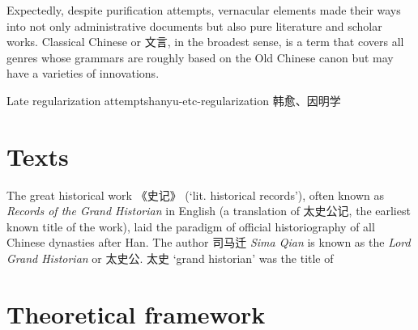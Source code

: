 \documentclass[UTF8, a4paper, oneside, scheme=plain, 12pt]{ctexrep}
\newcommand{\form}[1]{\emph{#1}}
\newcommand{\translate}[1]{`#1'}
\begin{document}
Expectedly, despite purification attempts,
vernacular elements made their ways into not only administrative documents
but also pure literature and scholar works.
Classical Chinese or 文言, in the broadest sense,
is a term that covers all genres whose grammars are roughly based on the Old Chinese canon
but may have a varieties of innovations.

\begin{todobox}{Late regularization attempts}{hanyu-etc-regularization}
    韩愈、因明学
\end{todobox}

\section{Texts}\label{sec:introduction.text}

The great historical work 《史记》 (\translate{lit. historical records}),
often known as \form{Records of the Grand Historian} in English
(a translation of 太史公记, the earliest known title of the work),
laid the paradigm of official historiography of all Chinese dynasties after Han.
The author 司马迁 \form{Sima Qian} is known as the \form{Lord Grand Historian} or 太史公.
太史 \translate{grand historian} was the title of

\section{Theoretical framework}\label{sec:intro.theory}
\end{document}
